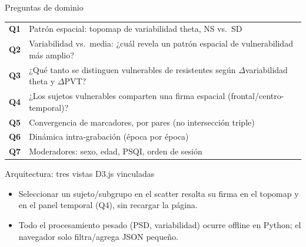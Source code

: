 \documentclass[10pt,aspectratio=169]{beamer}
\begin{document}
\begin{frame}{Preguntas de dominio}
\centering
\begin{tabular}{@{}p{}p{}@{}}
\toprule
\textbf{Q1} & Patrón espacial: topomap de variabilidad theta, NS vs.\ SD \\
\textbf{Q2} & Variabilidad vs.\ media: ¿cuál revela un patrón espacial de vulnerabilidad más amplio? \\
\textbf{Q3} & ¿Qué tanto se distinguen vulnerables de resistentes según $\Delta$variabilidad theta y $\Delta$PVT? \\
\textbf{Q4} & ¿Los sujetos vulnerables comparten una firma espacial (frontal/centro-temporal)? \\
\textbf{Q5} & Convergencia de marcadores, por pares (no intersección triple) \\
\textbf{Q6} & Dinámica intra-grabación (época por época) \\
\textbf{Q7} & Moderadores: sexo, edad, PSQI, orden de sesión \\
\bottomrule
\end{tabular}
\end{frame}

\begin{frame}{Arquitectura: tres vistas D3.js vinculadas}
\centering
{}
\vspace{1em}
\begin{itemize}
    \item Seleccionar un sujeto/subgrupo en el scatter resalta su firma en el topomap y en el panel temporal (Q4), sin recargar la página.
    \item Todo el procesamiento pesado (PSD, variabilidad) ocurre offline en Python; el navegador solo filtra/agrega JSON pequeño.
\end{itemize}
\end{frame}
\end{document}
